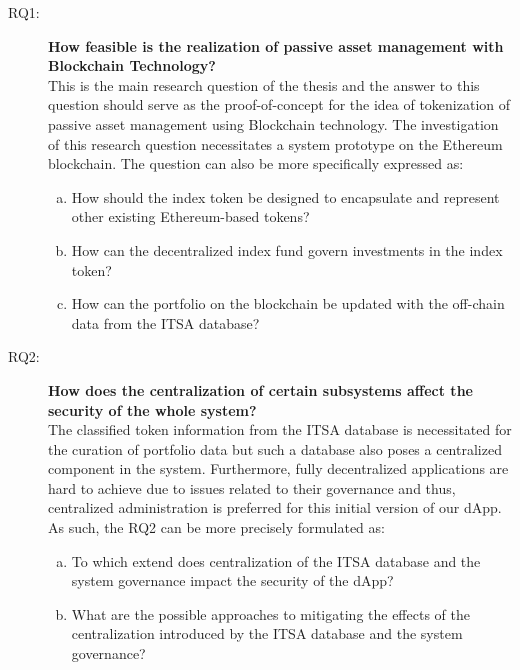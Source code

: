 \begin{description}
    \item[RQ1:] \textbf{How feasible is the realization of passive asset management with Blockchain Technology?}\\
    This is the main research question of the thesis and the answer to this question should serve as the proof-of-concept for the idea of tokenization of passive asset management using Blockchain technology. The investigation of this research question necessitates a system prototype on the Ethereum blockchain. The question can also be more specifically expressed as:
    \begin{enumerate}[(a)]
        \item How should the index token be designed to encapsulate and represent other existing Ethereum-based tokens?
        \item How can the decentralized index fund govern investments in the index token?
        \item How can the portfolio on the blockchain be updated with the off-chain data from the ITSA database?
    \end{enumerate}
    
    
    \item[RQ2:] \textbf{How does the centralization of certain subsystems affect the security of the whole system?}\\
    The classified token information from the ITSA database is necessitated for the curation of portfolio data but such a database also poses a centralized component in the system. Furthermore, fully decentralized applications are hard to achieve due to issues related to their governance and thus, centralized administration is preferred for this initial version of our dApp. As such, the RQ2 can be more precisely formulated as:
    \begin{enumerate}[(a)]
        \item To which extend does centralization of the ITSA database and the system governance impact the security of the dApp?
        
        \item What are the possible approaches to mitigating the effects of the centralization introduced by the ITSA database and the system governance?
    \end{enumerate}
    
    
    
\end{description}






